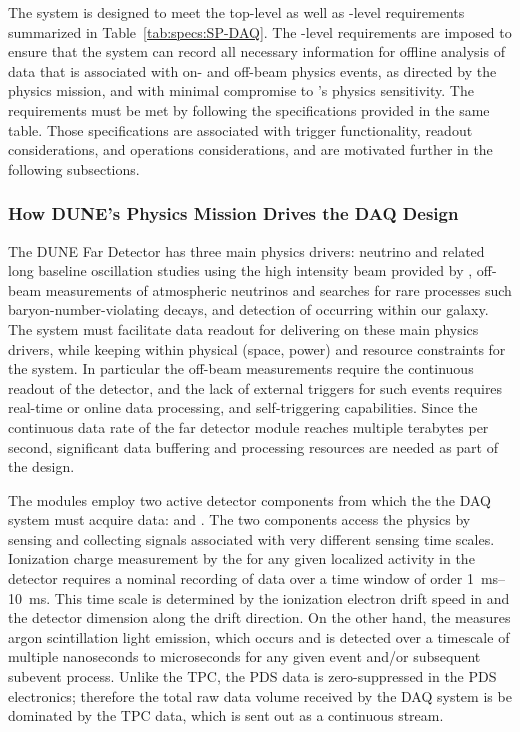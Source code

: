 The    system is designed to meet the
 top-level as well as -level requirements
summarized in Table~\ref{tab:specs:SP-DAQ}. The -level requirements are
imposed to ensure that the 
system %
can record all necessary information for offline 
analysis of data that is associated with on- and off-beam physics events, as directed
by the  physics mission, and with minimal compromise to
's physics sensitivity. The requirements must be met by following the 
specifications provided in the same table. Those specifications are
associated with trigger functionality, readout considerations,
and operations considerations, and are motivated further in the following subsections.

\subsubsection{How DUNE's Physics Mission Drives the DAQ Design}

The DUNE Far Detector has three main physics drivers: neutrino  and related
long baseline oscillation studies using the high intensity beam provided
by \fnal, off-beam measurements of atmospheric neutrinos and searches
for rare processes such baryon-number-violating decays,
and detection of  occurring within our galaxy. The
   system must facilitate data
readout for delivering on these main physics drivers, while keeping
within physical (space, power) and resource constraints for
the system. In particular the off-beam measurements require the
continuous readout of the detector, and the lack of external triggers for such
events requires real-time or online data processing, and
self-triggering capabilities. Since the
continuous data rate of the far detector module reaches multiple
terabytes per second, significant data buffering and processing
resources are needed as part of the design.

The   modules employ two
active detector components from which the the DAQ system must acquire data:  and . The two components access the physics %
by sensing and collecting signals associated with very different 
sensing time scales.
Ionization charge measurement by the  for any given
localized activity in the detector requires a
nominal recording of data over a time window of order 
\SIrange{1}{10}{\milli\second}. 
This time scale is determined by the ionization electron drift speed in
\lar and the detector dimension along the drift direction.
On the other hand, the  measures argon scintillation light emission, which
occurs and is detected over a timescale of multiple nanoseconds to
microseconds for
any given event and/or subsequent subevent process. Unlike the TPC,
the PDS data is zero-suppressed in
the PDS electronics; therefore the total raw data volume received by
the DAQ system is be dominated by
the TPC data, which is sent out as a continuous stream.
 
